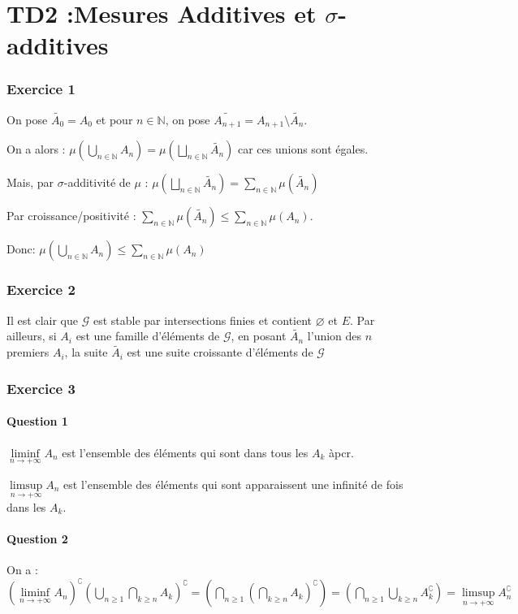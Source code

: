 \documentclass{cours}
\begin{document}
\part{TD2 :Mesures Additives et $\sigma$-additives}

\section{Exercice 1}
On pose $\tilde{A_{0}} = A_{0}$ et pour $n \in \mathbb{N}$, on pose $\tilde{A_{n+1}} = A_{n+1} \setminus \tilde{A_{n}}$.

On a alors : $\mu \left(\bigcup\limits_{n\in\mathbb{N}}A_{n}\right) = \mu\left(\bigsqcup\limits_{n\in\mathbb{N}}\tilde{A_{n}}\right)$ car ces unions sont égales.

Mais, par $\sigma$-additivité de $\mu$ : $\mu\left(\bigsqcup\limits_{n\in\mathbb{N}}\tilde{A_{n}}\right) = \sum_{n\in \mathbb{N}}\mu\left(\tilde{A_{n}}\right)$

Par croissance/positivité : $\sum_{n\in \mathbb{N}}\mu\left(\tilde{A_{n}}\right) \leq \sum_{n\in \mathbb{N}}\mu\left(A_{n}\right)$.

Donc: $\mu \left(\bigcup\limits_{n\in\mathbb{N}}A_{n}\right)\leq \sum_{n\in \mathbb{N}}\mu\left(A_{n}\right)$

\section{Exercice 2}
Il est clair que $\mathcal{G}$ est stable par intersections finies et contient $\varnothing$ et $E$. Par ailleurs, si $A_{i}$ est une famille d'éléments de $\mathcal{G}$, en posant $\tilde{A_{n}}$ l'union des $n$ premiers $A_{i}$, la suite $\tilde{A_{i}}$ est une suite croissante d'éléments de $\mathcal{G}$

\section{Exercice 3}
\subsection{Question 1}
$\liminf\limits_{n\to +\infty} A_{n}$ est l'ensemble des éléments qui sont dans tous les $A_{k}$ àpcr.

$\limsup\limits_{n\to +\infty} A_{n}$ est l'ensemble des éléments qui sont apparaissent une infinité de fois dans les $A_{k}$.

\subsection{Question 2}
On a : $\left(\liminf\limits_{n \to + \infty} A_{n}\right)^{\complement}\left(\bigcup\limits_{n \geq 1} \bigcap\limits_{k \geq n} A_{k}\right)^{\complement} = \left(\bigcap\limits_{n \geq 1} \left(\bigcap\limits_{k \geq n} A_{k}\right)^{\complement}\right) = \left(\bigcap\limits_{n \geq 1} \bigcup\limits_{k \geq n} A_{k}^{\complement}\right) = \limsup\limits_{n\to +\infty} A_{n}^{\complement} $
\end{document}
